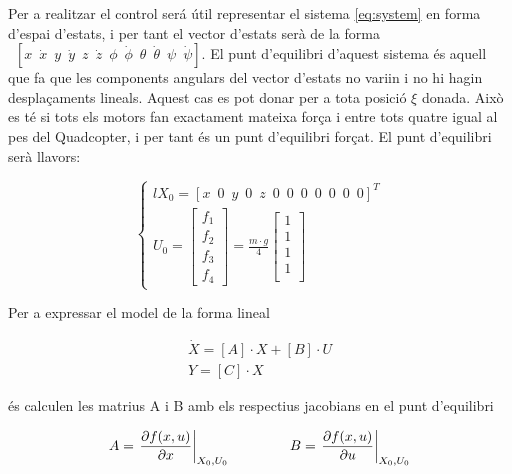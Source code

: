 \documentclass[twoside]{article}
\begin{document}
Per a realitzar el control será útil representar el sistema \ref{eq:system} en forma d'espai d'estats, i per tant el vector d'estats serà de la forma $\enspace \left[ x \enspace \dot{x} \enspace y \enspace \dot{y} \enspace z \enspace \dot{z} \enspace \phi \enspace \dot{\phi} \enspace \theta \enspace \dot{\theta} \enspace \psi \enspace \dot{\psi} \right]$. El punt d'equilibri d'aquest sistema és aquell que fa que les components angulars del vector d'estats no variin i no hi hagin desplaçaments lineals. Aquest cas es pot donar per a tota posició $\xi$ donada. Això es té si tots els motors fan exactament mateixa força i entre tots quatre igual al pes del Quadcopter, i per tant és un punt d'equilibri forçat. El punt d'equilibri serà llavors:

\begin{equation}
\begin{cases}{l}
X_0=\left[x \enspace 0 \enspace y \enspace 0 \enspace z \enspace 0 \enspace 0 \enspace 0 \enspace 0 \enspace 0 \enspace 0 \enspace 0 \right]^{T} \\
U_0=\left[ \begin{array}{l}
f_{1} \\
f_{2} \\
f_{3} \\
f_{4} \end{array} \right] = \frac{m \cdot g}{4} \left[ \begin{array}{l}
1 \\
1 \\
1 \\
1 \\ \end{array} \right]
\end{cases}
\end{equation}

Per a expressar el model de la forma lineal 

\begin{equation}
\begin{array}{l}
\dot{X}=[A] \cdot X + [B] \cdot U \\
Y = [C] \cdot X 
\end{array}
\end{equation} 

és calculen les matrius A i B amb els respectius jacobians en el punt d'equilibri

\begin{equation}
A=\left.{\frac{\partial f(x,u)}{\partial x}}\right\vert_{X_0,U_0} \hspace*{1.5cm} B=\left.{\frac{\partial f(x,u)}{\partial u}}\right\vert_{X_0,U_0}
\end{equation}
\end{document}

